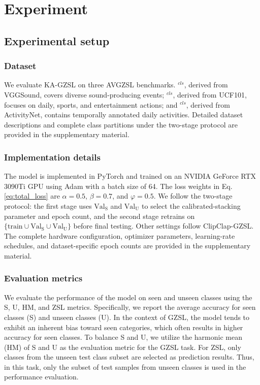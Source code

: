 \documentclass[10pt,journal,twoside]{IEEEtran}
\begin{document}
\section{Experiment}



\subsection{Experimental setup}
\subsubsection{Dataset}
We evaluate KA-GZSL on three AVGZSL benchmarks. $^{\textit{cls}}$, derived from VGGSound\cite{34}, covers diverse sound-producing events; $^{\textit{cls}}$, derived from UCF101\cite{35}, focuses on daily, sports, and entertainment actions; and $^{\textit{cls}}$, derived from ActivityNet\cite{36}, contains temporally annotated daily activities. Detailed dataset descriptions and complete class partitions under the two-stage protocol are provided in the supplementary material.


\subsubsection{Implementation details}
The model is implemented in PyTorch and trained on an NVIDIA GeForce RTX 3090Ti GPU using Adam\cite{37} with a batch size of 64. The loss weights in Eq. \eqref{eq:total_loss} are $\alpha=0.5$, $\beta=0.7$, and $\varphi=0.5$. We follow the two-stage protocol\cite{1,5,7}: the first stage uses $\text{Val}_\text{S}$ and $\text{Val}_\text{U}$ to select the calibrated-stacking parameter and epoch count, and the second stage retrains on $\{\text{train} \cup \text{Val}_\text{S} \cup \text{Val}_\text{U}\}$ before final testing. Other settings follow ClipClap-GZSL\cite{2}. The complete hardware configuration, optimizer parameters, learning-rate schedules, and dataset-specific epoch counts are provided in the supplementary material.


\subsubsection{Evaluation metrics}
We evaluate the performance of the model on seen and unseen classes using the S, U, HM, and ZSL metrics. Specifically, we report the average accuracy for seen classes (S) and unseen classes (U). In the context of GZSL, the model tends to exhibit an inherent bias toward seen categories, which often results in higher accuracy for seen classes. To balance S and U, we utilize the harmonic mean (HM) of S and U as the evaluation metric for the GZSL task. For ZSL, only classes from the unseen test class subset are selected as prediction results. Thus, in this task, only the subset of test samples from unseen classes is used in the performance evaluation.
\end{document}
